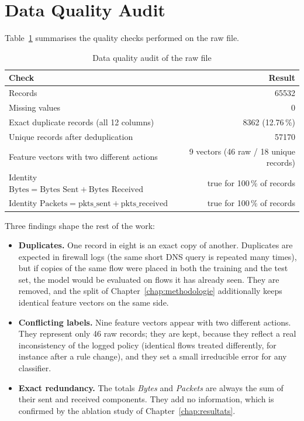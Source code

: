 \section{Data Quality Audit}
Table~\ref{tab:audit} summarises the quality checks performed on the raw file.

\begin{table}[htbp]
  \centering
  \caption{Data quality audit of the raw file}
  \label{tab:audit}
  \small
  \begin{tabular}{|l|r|}
    \hline
    \textbf{Check} & \textbf{Result} \\
    \hline
    Records & \num{65532} \\
    Missing values & 0 \\
    Exact duplicate records (all 12 columns) & \num{8362} (12.76\,\%) \\
    Unique records after deduplication & \num{57170} \\
    Feature vectors with two different actions & 9 vectors (46 raw / 18 unique records) \\
    Identity $\text{Bytes} = \text{Bytes Sent} + \text{Bytes Received}$ & true for 100\,\% of records \\
    Identity $\text{Packets} = \text{pkts\_sent} + \text{pkts\_received}$ & true for 100\,\% of records \\
    \hline
  \end{tabular}
\end{table}

Three findings shape the rest of the work:
\begin{itemize}
  \item \textbf{Duplicates.} One record in eight is an exact copy of another. Duplicates are expected in firewall logs (the same short DNS query is repeated many times), but if copies of the same flow were placed in both the training and the test set, the model would be evaluated on flows it has already seen. They are removed, and the split of Chapter~\ref{chap:methodologie} additionally keeps identical feature vectors on the same side.
  \item \textbf{Conflicting labels.} Nine feature vectors appear with two different actions. They represent only 46 raw records; they are kept, because they reflect a real inconsistency of the logged policy (identical flows treated differently, for instance after a rule change), and they set a small irreducible error for any classifier.
  \item \textbf{Exact redundancy.} The totals \emph{Bytes} and \emph{Packets} are always the sum of their sent and received components. They add no information, which is confirmed by the ablation study of Chapter~\ref{chap:resultats}.
\end{itemize}

